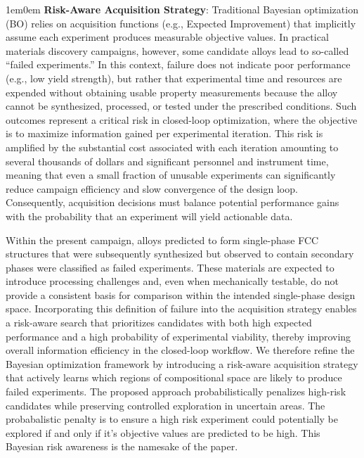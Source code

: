 \begin{adjustwidth}{1em}{0em}
\indent \textbf{Risk-Aware Acquisition Strategy}: 
Traditional Bayesian optimization (BO) relies on acquisition functions (e.g., Expected Improvement) that implicitly assume each experiment produces measurable objective values. In practical materials discovery campaigns, however, some candidate alloys lead to so-called ``failed experiments.'' In this context, failure does not indicate poor performance (e.g., low yield strength), but rather that experimental time and resources are expended without obtaining usable property measurements because the alloy cannot be synthesized, processed, or tested under the prescribed conditions. Such outcomes represent a critical risk in closed-loop optimization, where the objective is to maximize information gained per experimental iteration. This risk is amplified by the substantial cost associated with each iteration amounting to several thousands of dollars and significant personnel and instrument time, meaning that even a small fraction of unusable experiments can significantly reduce campaign efficiency and slow convergence of the design loop. Consequently, acquisition decisions must balance potential performance gains with the probability that an experiment will yield actionable data.

Within the present campaign, alloys predicted to form single-phase FCC structures that were subsequently synthesized but observed to contain secondary phases were classified as failed experiments. These materials are expected to introduce processing challenges and, even when mechanically testable, do not provide a consistent basis for comparison within the intended single-phase design space. Incorporating this definition of failure into the acquisition strategy enables a risk-aware search that prioritizes candidates with both high expected performance and a high probability of experimental viability, thereby improving overall information efficiency in the closed-loop workflow. We therefore refine the Bayesian optimization framework by introducing a risk-aware acquisition strategy that actively learns which regions of compositional space are likely to produce failed experiments. The proposed approach probabilistically penalizes high-risk candidates while preserving controlled exploration in uncertain areas. The probabalistic penalty is to ensure a high risk experiment could potentially be explored if and only if it's objective values are predicted to be high. This Bayesian risk awareness is the namesake of the paper.


\end{adjustwidth}

